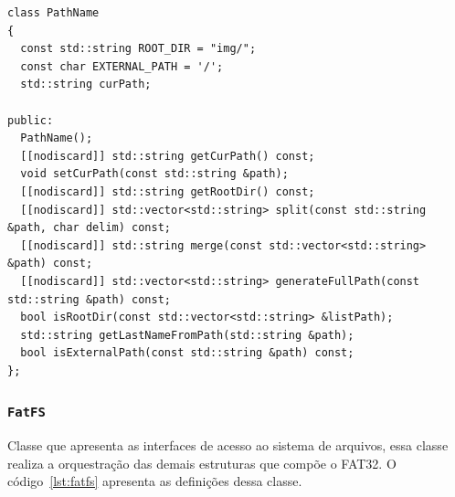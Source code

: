 \documentclass[
    12pt,				%
    oneside,   	        %
    a4paper,			%
    english,			%
    french,				%
    spanish,			%
    brazil,				%
    ]{pacotes/abntex2}
\begin{document}
\begin{lstlisting}[caption={Classe para manipulação de caminhos no sistema}, label={lst:pathname}]
class PathName
{
  const std::string ROOT_DIR = "img/";
  const char EXTERNAL_PATH = '/';
  std::string curPath;

public:
  PathName();
  [[nodiscard]] std::string getCurPath() const;
  void setCurPath(const std::string &path);
  [[nodiscard]] std::string getRootDir() const;
  [[nodiscard]] std::vector<std::string> split(const std::string &path, char delim) const;
  [[nodiscard]] std::string merge(const std::vector<std::string> &path) const;
  [[nodiscard]] std::vector<std::string> generateFullPath(const std::string &path) const;
  bool isRootDir(const std::vector<std::string> &listPath);
  std::string getLastNameFromPath(std::string &path);
  bool isExternalPath(const std::string &path) const;
};
\end{lstlisting}

\subsubsection{\texttt{FatFS}}
\label{subsubsec:fatfs}

Classe que apresenta as interfaces de acesso ao sistema de arquivos, essa classe realiza a orquestração das demais estruturas que compõe o FAT32. O código~\ref{lst:fatfs} apresenta as definições dessa classe.
\end{document}
